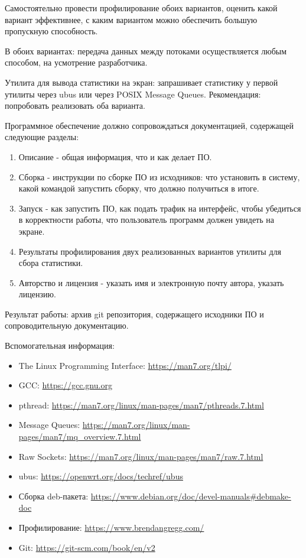 \linespace

Самостоятельно провести профилирование обоих вариантов, оценить какой вариант эффективнее, с каким вариантом можно обеспечить большую пропускную способность.

В обоих вариантах: передача данных между потоками осуществляется любым способом, на усмотрение разработчика.

Утилита для вывода статистики на экран: запрашивает статистику у первой утилиты через ubus или через POSIX Message Queues. Рекомендация: попробовать реализовать оба варианта.

\linespace

Программное обеспечение должно сопровождаться документацией, содержащей следующие разделы:
\begin{enumerate}
    \item Описание - общая информация, что и как делает ПО.
    \item Сборка - инструкции по сборке ПО из исходников: что установить в систему,
какой командой запустить сборку, что должно получиться в итоге.
    \item Запуск - как запустить ПО, как подать трафик на интерфейс, чтобы убедиться в
корректности работы, что пользователь программ должен увидеть на экране.
    \item Результаты профилирования двух реализованных вариантов утилиты для сбора статистики.
    \item Авторство и лицензия - указать имя и электронную почту автора, указать лицензию.
\end{enumerate}

Результат работы: архив git репозитория, содержащего исходники ПО и сопроводительную документацию.

\linespace

Вспомогательная информация:
\begin{itemize}
    \item The Linux Programming Interface: \url{https://man7.org/tlpi/}
    \item GCC: \url{https://gcc.gnu.org}
    \item pthread: \url{https://man7.org/linux/man-pages/man7/pthreads.7.html}
    \item Message Queues: \url{https://man7.org/linux/man-pages/man7/mq_overview.7.html}
    \item Raw Sockets: \url{https://man7.org/linux/man-pages/man7/raw.7.html}
    \item ubus: \url{https://openwrt.org/docs/techref/ubus}
    \item Сборка deb-пакета: \url{https://www.debian.org/doc/devel-manuals#debmake-doc}
    \item Профилирование: \url{https://www.brendangregg.com/}
    \item Git: \url{https://git-scm.com/book/en/v2}
\end{itemize}
